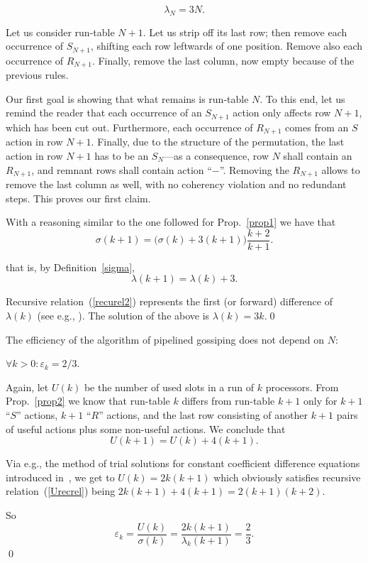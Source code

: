 \documentclass{elsart}
\begin{document}
\begin{prop}\label{prop2}
\[  \lambda_N = 3N. \]
\end{prop}
\begin{pf}

Let us consider run-table $N+1$. Let us strip off its last row; then remove 
each occurrence of $S_{N+1}$, shifting each row leftwards of one 
position.
Remove also each occurrence of $R_{N+1}$. Finally, remove the last
column, now empty because of the previous rules.

Our first goal is showing that what remains is run-table $N$.
To this end, let us remind the reader that each occurrence of an $S_{N+1}$ action only
affects row $N+1$, which has been cut out. Furthermore, each occurrence of $R_{N+1}$ comes from
an $S$ action in row $N+1$. Finally, due to the structure of the permutation,
the last action in row $N+1$ has to be an $S_N$---as a consequence, row $N$ shall contain
an $R_{N+1}$, and remnant rows shall contain action ``$-$''. Removing the $R_{N+1}$ allows
to remove the last column as well, with no coherency violation and no redundant steps.
This proves our first claim.

With a reasoning similar to the one followed for Prop.~\ref{prop1}
we have that
\begin{equation}\label{left2}
\sigma(k+1)= \bigl( \sigma(k) + 3(k+1) \bigr) \frac{k+2}{k+1}.
\end{equation}

that is, by Definition~\ref{sigma},
\begin{equation}\label{recurel2}
\lambda(k+1) = \lambda(k) + 3.
\end{equation}

Recursive relation~(\ref{recurel2}) represents
the first (or forward) difference of $\lambda(k)$ (see e.g., \cite{PaWi79}).
The solution of the above is $\lambda(k) = 3k$.\qed
\end{pf}

The efficiency of the algorithm of pipelined gossiping does not depend
on $N$:
\begin{prop}
$\forall k>0: \varepsilon_k = 2/3$.
\end{prop}
\begin{pf}
Again, let $U(k)$ be the number of used slots in a run of $k$ processors.
From Prop.~\ref{prop2} we know that run-table $k$ differs from run-table $k+1$
only for $k+1$ ``$S$'' actions, $k+1$ ``$R$'' actions, and the last row
consisting of another $k+1$ pairs of useful actions plus some 
non-useful actions.  We conclude that 
\begin{equation}\label{Urecrel}
U(k+1) = U(k)+4(k+1).
\end{equation}

Via e.g., the method of trial solutions for constant coefficient difference
equations introduced in~\cite[p.~16]{PaWi79}, we get to
$U(k)=2k(k+1)$ which obviously satisfies recursive relation~(\ref{Urecrel})
being $2k(k+1)+4(k+1)=2(k+1)(k+2)$.

So
\begin{equation}
\varepsilon_k=\frac{U(k)}{\sigma(k)}=\frac{2k(k+1)}{\lambda_k(k+1)}=\frac23.
\end{equation}
\qed
\end{pf}
\end{document}
